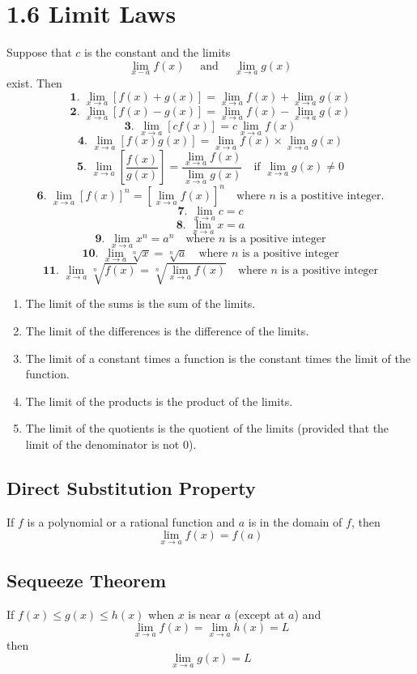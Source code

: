 %
%

\section*{1.6 Limit Laws}

Suppose that \(c\) is the constant and the limits 
$$\lim_{x-a}f(x) \quad \text{ and } \quad \lim_{x \to a}g(x)$$
exist. Then
$$\textbf{1. }\lim_{x \to a}[f(x)+g(x)]=\lim_{x \to a}f(x) + \lim_{x \to a}g(x)$$
$$\textbf{2. }\lim_{x \to a}[f(x)-g(x)]=\lim_{x \to a}f(x) - \lim_{x \to a}g(x)$$
$$\textbf{3. }\lim_{x \to a}[cf(x)]=c\lim_{x \to a}f(x)$$
$$\textbf{4. }\lim_{x \to a}[f(x)g(x)]=\lim_{x \to a}f(x) \times \lim_{x \to a}g(x)$$
$$\textbf{5. }\lim_{x \to a}[\frac{f(x)}{g(x)}]=\frac{\lim_{x \to a}f(x)}{\lim_{x \to a}g(x)} \quad \text{if } \lim_{x \to a}g(x) \neq 0 $$
$$\textbf{6. }\lim_{x \to a}{[f(x)]}^n={[\lim_{x \to a}f(x)]}^n \quad \text{where } n \text{ is a postitive integer.}$$
$$\textbf{7. }\lim_{x \to a}c=c$$
$$\textbf{8. }\lim_{x \to a}x=a$$
$$\textbf{9. }\lim_{x \to a}x^n=a^n \quad \text{where } n \text{ is a positive integer}$$
$$\textbf{10. }\lim_{x \to a}\sqrt[n]x=\sqrt[n]a \quad \text{where } n \text{ is a positive integer}$$
$$\textbf{11. }\lim_{x \to a}\sqrt[n]{f(x)}=\sqrt[n]{\lim_{x \to a}f(x)} \quad \text{where } n \text{ is a positive integer}$$

\begin{enumerate}
    \item The limit of the sums is the sum of the limits.
    \item The limit of the differences is the difference of the limits.
    \item The limit of a constant times a function is the constant times the limit of the function.
    \item The limit of the products is the product of the limits.
    \item The limit of the quotients is the quotient of the limits (provided that the limit of the denominator is not 0).
\end{enumerate}

\subsection*{Direct Substitution Property}

If \(f\) is a polynomial or a rational function and \(a\) is in the domain of \(f\), then 
$$\lim_{x \to a}f(x)=f(a)$$

\subsection*{Sequeeze Theorem}

If \(f(x) \leq g(x) \leq h(x)\) when \(x\) is near \(a\) (except at \(a\)) and 
$$\lim_{x \to a}f(x)=\lim_{x \to a}h(x) = L$$
then
$$\lim_{x \to a}g(x) = L$$
